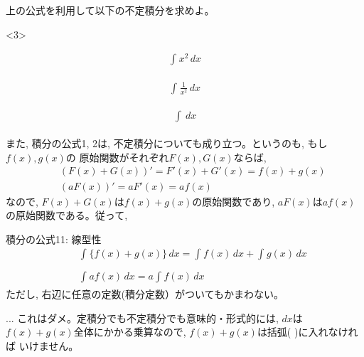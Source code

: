 \begin{q}\label{q:int_0} 上の公式を利用して以下の不定積分を求めよ。
\begin{edaenumerate}<3>
\item \begin{eqnarray*}\int_{}^{} x^2\, dx\end{eqnarray*}
\item \begin{eqnarray*}\int_{}^{} \frac{1}{x^2}\, dx\end{eqnarray*}
\item \begin{eqnarray*}\int_{}^{}\, dx\end{eqnarray*}
\end{edaenumerate}\end{q}
\vspace{0.3cm}

また, 積分の公式1, 2は, 不定積分についても成り立つ。というのも, もし$f(x), g(x)$の
原始関数がそれぞれ$F(x), G(x)$ならば, 
\begin{eqnarray*}
&&(F(x)+G(x))'=F'(x)+G'(x)=f(x)+g(x)\\
&&(aF(x))'=aF'(x)=af(x)
\end{eqnarray*}
なので, $F(x)+G(x)$は$f(x)+g(x)$の原始関数であり, $aF(x)$は$af(x)$の原始関数である。従って, 

\begin{itembox}{積分の公式11: 線型性}
\begin{eqnarray}
&&\int_{}^{} \bigl\{f(x)+g(x)\bigr\}\, dx=\int_{}^{} f(x)\, dx + \int_{}^{} g(x)\, dx\nonumber\\
\label{eq:futeisekibun_koshiki11_2}\\
&&\int_{}^{} af(x)\, dx=a\int_{}^{} f(x)\, dx
\end{eqnarray}
ただし, 右辺に任意の定数(積分定数）がついてもかまわない。
\end{itembox}

\begin{freqmiss}{\small{} ... これはダメ。定積分でも不定積分でも意味的・形式的には, 
$dx$は$f(x)+g(x)$全体にかかる乗算なので, $f(x)+g(x)$は括弧( )に入れなければ
いけません。}\end{freqmiss}\mv

